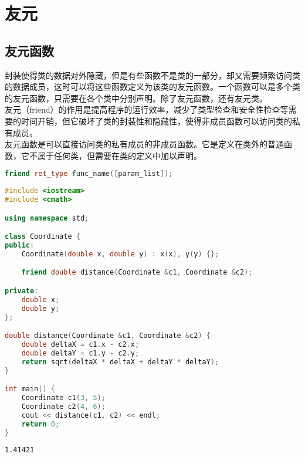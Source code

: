 \newpage

\section{友元}

\subsection{友元函数}

封装使得类的数据对外隐藏，但是有些函数不是类的一部分，却又需要频繁访问类的数据成员，这时可以将这些函数定义为该类的友元函数。一个函数可以是多个类的友元函数，只需要在各个类中分别声明。除了友元函数，还有友元类。 \\

友元（friend）的作用是提高程序的运行效率，减少了类型检查和安全性检查等需要的时间开销，但它破坏了类的封装性和隐藏性，使得非成员函数可以访问类的私有成员。 \\

友元函数是可以直接访问类的私有成员的非成员函数。它是定义在类外的普通函数，它不属于任何类，但需要在类的定义中加以声明。

\vspace{-0.5cm}

\begin{lstlisting}[language=C++]
friend ret_type func_name([param_list]);
\end{lstlisting}

\vspace{0.5cm}


\begin{lstlisting}[language=C++]
#include <iostream>
#include <cmath>

using namespace std;

class Coordinate {
public:
    Coordinate(double x, double y) : x(x), y(y) {};

    friend double distance(Coordinate &c1, Coordinate &c2);

private:
    double x;
    double y;
};

double distance(Coordinate &c1, Coordinate &c2) {
    double deltaX = c1.x - c2.x;
    double deltaY = c1.y - c2.y;
    return sqrt(deltaX * deltaX + deltaY * deltaY);
}

int main() {
    Coordinate c1(3, 5);
    Coordinate c2(4, 6);
    cout << distance(c1, c2) << endl;
    return 0;
}
\end{lstlisting}

\begin{tcolorbox}
	\begin{verbatim}
1.41421
	\end{verbatim}
\end{tcolorbox}

